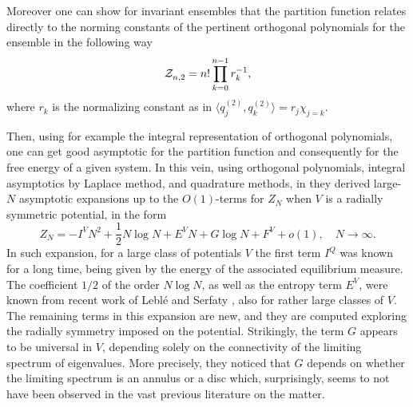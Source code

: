 Moreover one can show for invariant ensembles that the partition function relates directly to the norming constants of the pertinent orthogonal polynomials for the ensemble in the following way
\begin{equation}
	\mathcal{Z}_{n,2}^{} = n! \prod_{k=0}^{n-1} r_k^{-1},
\end{equation}
where $r_k$ is the normalizing constant as in $\langle q_j^{(2)}, q_k^{(2)} \rangle = r_j \chi_{j=k}$.

Then, using for example the integral representation of orthogonal polynomials, one can get good asymptotic for the partition function and consequently for the free energy of a given system. In this vein, using orthogonal polynomials, integral asymptotics by Laplace method, and quadrature methods, in \cite{Byun_2023} they derived large-$N$ asymptotic expansions up to the $O(1)$-terms for  $Z_{N}$ when $V$ is a radially symmetric potential, in the form
%
\begin{equation}
	Z_{N}=-I^VN^2+\frac{1}{2}N\log N+E^V N+G\log N+F^V + o(1),\quad N\to \infty.
\end{equation}
%
In such expansion, for a large class of potentials $V$ the first term $I^Q$ was known for a long time, being given by the energy of the associated equilibrium measure. The coefficient $1/2$ of the order $N\log N$, as well as the entropy term $E^V$, were known from recent work of Leblé and Serfaty \cite{leblé2017large}, also for rather large classes of $V$. The remaining terms in this expansion are new, and they are computed exploring the radially symmetry imposed on the potential. Strikingly, the term $G$ appears to be universal in $V$, depending solely on the connectivity of the limiting spectrum of eigenvalues. More precisely, they noticed that $G$ depends on whether the limiting spectrum is an annulus or a disc which, surprisingly, seems to not have been observed in the vast previous literature on the matter. 

